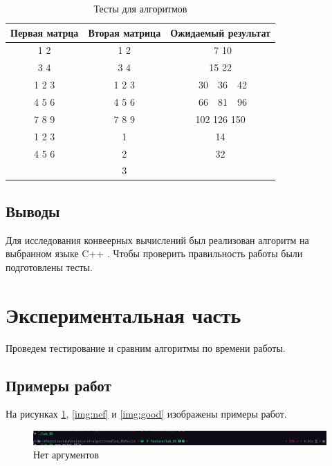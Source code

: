 \documentclass[a4paper,12pt]{article}
\begin{document}
\begin{table}[H]
    \caption{Тесты для алгоритмов}
    \label{table:test}
    \centering
    \begin{tabular}{|c|c|c|}
        \hline
        Первая матрца & Вторая матрица & Ожидаемый результат \\
        \hline
        1 2 & 1 2 & \ 7 10 \\
        3 4 & 3 4 & 15 22 \\
        \hline
        1 2 3 & 1 2 3 & \ 30\ \ 36\ \ 42 \\
        4 5 6 & 4 5 6 & \ 66\ \ 81\ \ 96 \\
        7 8 9 & 7 8 9 & 102 126 150 \\
        \hline
        1 2 3 & 1 & 14 \\
        4 5 6 & 2 & 32 \\
              & 3 & \\
        \hline
    \end{tabular}
\end{table}

\subsection{Выводы}

Для исследования конвеерных вычислений был реализован алгоритм на выбранном языке
{ \ttfamily C++ }. Чтобы проверить правильность работы были подготовлены тесты.

\newpage
\section{Экспериментальная часть}

Проведем тестирование и сравним алгоритмы по времени работы.

\subsection{Примеры работ}

На рисунках \ref{img:zero}, \ref{img:nef} и \ref{img:good} изображены примеры работ.

\begin{figure}[H]
    \centering
    \includegraphics[scale=0.4]{zero_arg}
    \caption{Нет аргументов}
    \label{img:zero}
\end{figure}
\end{document}
